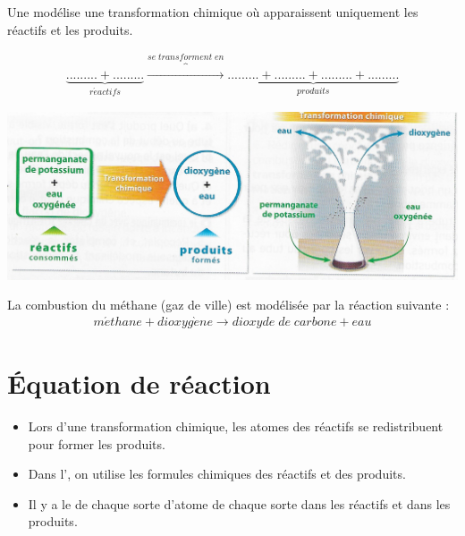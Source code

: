 \documentclass[12pt,a4paper]{article}
\begin{document}
\begin{mybilan}
	Une  modélise une transformation chimique où apparaissent uniquement les réactifs et les produits.
	
	\begin{align*}
		\underbrace{......... + .........}_{r\acute{e}actifs} \overbrace{\rightarrow}^{se\; transforment\; en}  \underbrace{......... + ......... + ......... + .........}_{produits}
	\end{align*}


	\begin{center}
		\includegraphics[scale=0.3]{img/O2}
	\end{center}
\end{mybilan}

\begin{myex}
	La combustion du méthane (gaz de ville) est modélisée par la réaction suivante :
	\begin{align*}
		m\acute{e}thane + dioxyg\grave{e}ne \rightarrow dioxyde\; de \; carbone + eau 
	\end{align*}
\end{myex}

\section{\'Equation de réaction}


\begin{mybilan}
	\begin{itemize}
		\item Lors d'une transformation chimique, les atomes des réactifs se redistribuent pour former les produits.
		
		\item Dans l', on utilise les formules chimiques des réactifs et des produits.
		
		\item Il y a le  de chaque sorte d'atome de chaque sorte dans les réactifs et dans les produits.
	\end{itemize}
\end{mybilan}
\end{document}

